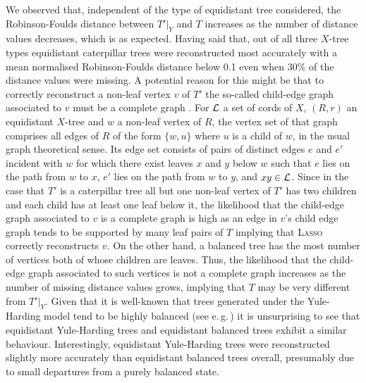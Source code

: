 We observed that, independent of the type of equidistant tree considered, the
Robinson-Foulds distance between $T'|_Y$ and $T$ increases as the number of
distance values decreases, which is as expected. Having said that, out of all
three $X$-tree types equidistant caterpillar trees were reconstructed most
accurately with a mean normalised Robinson-Foulds distance below 0.1 even when
$30\%$ of the distance values were missing. A potential reason for this might
be that to correctly reconstruct a non-leaf vertex $v$ of $T'$ the so-called
child-edge graph associated to $v$ must be a complete graph
\cite{huber13lassoing}.  For ${\mathcal L}$ a set of cords of $X$, $(R,r)$ an
equidistant $X$-tree and $w$ a non-leaf vertex of $R$, the vertex set of that
graph comprises all edges of $R$ of the form $\{w,u\}$ where $u$ is a child of
$w$, in the usual graph theoretical sense.  Its edge set consists of pairs of
distinct edges $e$ and $e'$ incident with $w$ for which there exist leaves $x$
and $y$ below $w$ such that $e$ lies on the path from $w$ to $x$, $e'$ lies on
the path from $w$ to $y$, and $xy\in {\mathcal L}$. Since in the case that $T'$ is a
caterpillar tree all but one non-leaf vertex of $T'$ has two children and each
child has at least one leaf below it, the likelihood that the child-edge graph
associated to $v$ is a complete graph is high as an edge in $v$'s child edge
graph tends to be supported by many leaf pairs of $T$ implying that
\textsc{Lasso} correctly reconstructs $v$. On the other hand, a balanced tree
has the most number of vertices both of whose children are leaves. Thus, the
likelihood that the child-edge graph associated to such vertices is not a
complete graph increases as the number of missing distance values grows,
implying that $T$ may be very different from $T'|_Y$. Given that it is
well-known that trees generated under the Yule-Harding model tend to be highly
balanced (see e.\,g.\,\cite[Section 2.5]{semple2003phylogenetics}) it is
unsurprising to see that equidistant Yule-Harding trees and equidistant
balanced trees exhibit a similar behaviour.  Interestingly, equidistant
Yule-Harding trees were reconstructed slightly more accurately than
equidistant balanced trees overall, presumably due to small departures from a
purely balanced state.

